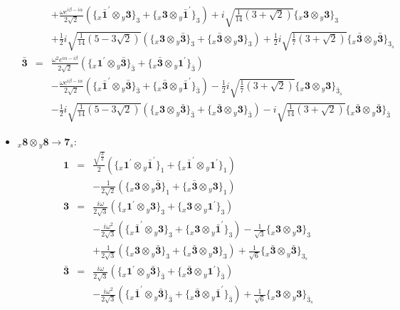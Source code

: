 \documentclass[english]{article}
\newcommand{\rep}[1]{\mathbf{#1}}
\newcommand{\repx}[2]{{}_{#2}\mathbf{#1}}
\newcommand{\subcg}[3]{\big\{ \repx{#1}{x}\otimes\repx{#2}{y}\big\}^{}_{#3}}
\begin{document}
\begin{itemize}
\begin{eqnarray*}
 & & +\frac{\omega  e^{i \beta -i \alpha }}{2 \sqrt{2}}\left(\subcg{\bar{1}^{\prime}}{3}{3}+\subcg{3}{\bar{1}^{\prime}}{3}\right)+i \sqrt{\frac{1}{14} \left(3+\sqrt{2}\right)}\subcg{3}{3}{3} \\ 
 & & +\frac{1}{2} i \sqrt{\frac{1}{14} \left(5-3 \sqrt{2}\right)}\left(\subcg{3}{\bar{3}}{3}+\subcg{\bar{3}}{3}{3}\right)+\frac{1}{2} i \sqrt{\frac{1}{7} \left(3+\sqrt{2}\right)}\subcg{\bar{3}}{\bar{3}}{3_{s}}
\\
\rep{\bar{3}} &=& \frac{\omega ^2 e^{i \alpha -i \beta }}{2 \sqrt{2}}\left(\subcg{1^{\prime}}{\bar{3}}{\bar{3}}+\subcg{\bar{3}}{1^{\prime}}{\bar{3}}\right) \\ 
 & & -\frac{\omega  e^{i \beta -i \alpha }}{2 \sqrt{2}}\left(\subcg{\bar{1}^{\prime}}{\bar{3}}{\bar{3}}+\subcg{\bar{3}}{\bar{1}^{\prime}}{\bar{3}}\right)-\frac{1}{2} i \sqrt{\frac{1}{7} \left(3+\sqrt{2}\right)}\subcg{3}{3}{\bar{3}_{s}} \\ 
 & & -\frac{1}{2} i \sqrt{\frac{1}{14} \left(5-3 \sqrt{2}\right)}\left(\subcg{3}{\bar{3}}{\bar{3}}+\subcg{\bar{3}}{3}{\bar{3}}\right)-i \sqrt{\frac{1}{14} \left(3+\sqrt{2}\right)}\subcg{\bar{3}}{\bar{3}}{\bar{3}}
\end{eqnarray*}
\item $\repx{8}{x}\otimes\repx{8}{y}\to\rep{7}_{s}$:
\begin{eqnarray*}
\rep{1} &=& \frac{\sqrt{\frac{3}{2}}}{2}\left(\subcg{1^{\prime}}{\bar{1}^{\prime}}{1}+\subcg{\bar{1}^{\prime}}{1^{\prime}}{1}\right) \\ 
 & & -\frac{1}{2 \sqrt{2}}\left(\subcg{3}{\bar{3}}{1}+\subcg{\bar{3}}{3}{1}\right)
\\
\rep{3} &=& \frac{i \omega }{2 \sqrt{3}}\left(\subcg{1^{\prime}}{3}{3}+\subcg{3}{1^{\prime}}{3}\right) \\ 
 & & -\frac{i \omega ^2}{2 \sqrt{3}}\left(\subcg{\bar{1}^{\prime}}{3}{3}+\subcg{3}{\bar{1}^{\prime}}{3}\right)-\frac{1}{\sqrt{3}}\subcg{3}{3}{3} \\ 
 & & +\frac{1}{2 \sqrt{3}}\left(\subcg{3}{\bar{3}}{3}+\subcg{\bar{3}}{3}{3}\right)+\frac{1}{\sqrt{6}}\subcg{\bar{3}}{\bar{3}}{3_{s}}
\\
\rep{\bar{3}} &=& \frac{i \omega }{2 \sqrt{3}}\left(\subcg{1^{\prime}}{\bar{3}}{\bar{3}}+\subcg{\bar{3}}{1^{\prime}}{\bar{3}}\right) \\ 
 & & -\frac{i \omega ^2}{2 \sqrt{3}}\left(\subcg{\bar{1}^{\prime}}{\bar{3}}{\bar{3}}+\subcg{\bar{3}}{\bar{1}^{\prime}}{\bar{3}}\right)+\frac{1}{\sqrt{6}}\subcg{3}{3}{\bar{3}_{s}} \\ 

\end{eqnarray*}
\end{itemize}
\end{document}
